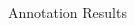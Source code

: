 \documentclass[final,t]{beamer}
\begin{document}
\begin{frame}{}
\begin{columns}[t]
\begin{column}{.33\linewidth}
\begin{block}{Annotation Results}
\begin{center}
\begin{minipage}{.85\textwidth}


\end{minipage}
\end{center}
\end{block}
\end{column}
\end{columns}
\end{frame}
\end{document}
